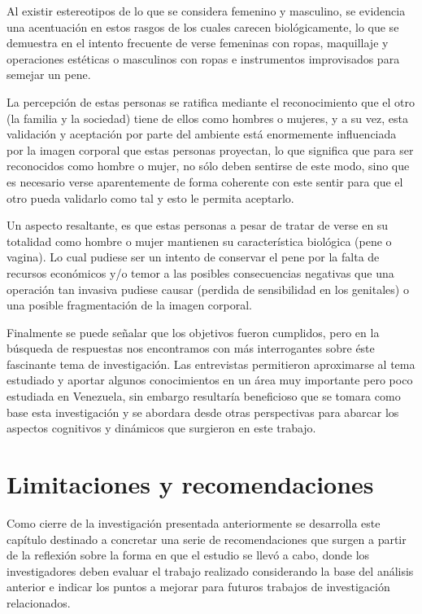 Al existir estereotipos de lo que se considera femenino y masculino, se
evidencia una acentuación en estos rasgos de los cuales carecen biológicamente,
lo que se demuestra en el intento frecuente de verse femeninas con ropas,
maquillaje y operaciones estéticas o masculinos con ropas e instrumentos
improvisados para semejar un pene.

La percepción de estas personas se ratifica mediante el reconocimiento que el
otro (la familia y la sociedad) tiene de ellos como hombres o mujeres, y a su
vez, esta validación y aceptación por parte del ambiente está enormemente
influenciada por la imagen corporal que estas personas proyectan, lo que
significa que para ser reconocidos como hombre o mujer, no sólo deben sentirse
de este modo, sino que es necesario verse aparentemente de forma coherente con
este sentir para que el otro pueda validarlo como tal y esto le permita
aceptarlo.

Un aspecto resaltante, es que estas personas a pesar de tratar de verse en su
totalidad como hombre o mujer mantienen su característica biológica (pene o
vagina). Lo cual pudiese ser un intento de conservar el pene por la falta de
recursos económicos y/o temor a las posibles consecuencias negativas que una
operación tan invasiva pudiese causar (perdida de sensibilidad en los genitales)
o una posible fragmentación de la imagen corporal.

Finalmente se puede señalar que los objetivos fueron cumplidos, pero en la
búsqueda de respuestas nos encontramos con más interrogantes sobre éste
fascinante tema de investigación. Las entrevistas permitieron aproximarse al
tema estudiado y aportar algunos conocimientos en un área muy importante pero
poco estudiada en Venezuela, sin embargo resultaría beneficioso que se tomara
como base esta investigación y se abordara desde otras perspectivas para abarcar
los aspectos cognitivos y dinámicos que surgieron en este trabajo.


\section{Limitaciones y recomendaciones}

Como cierre de la investigación presentada anteriormente se desarrolla este
capítulo destinado a concretar  una serie de recomendaciones que surgen a partir
de la reflexión sobre la forma en que el estudio se llevó a cabo, donde los
investigadores deben evaluar el trabajo realizado considerando la base del
análisis anterior e indicar los puntos a mejorar para futuros trabajos de
investigación relacionados.

